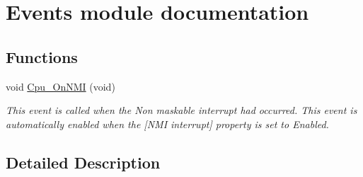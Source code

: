 \hypertarget{group___events__module}{}\section{Events module documentation}
\label{group___events__module}
\subsection*{Functions}
\begin{DoxyCompactItemize}
\item 
void \hyperlink{group___events__module_gabaee6afd9e7b4a0a57dc661945543d24}{Cpu\+\_\+\+On\+N\+MI} (void)\hypertarget{group___events__module_gabaee6afd9e7b4a0a57dc661945543d24}{}\label{group___events__module_gabaee6afd9e7b4a0a57dc661945543d24}

\begin{DoxyCompactList}\small\item\em This event is called when the Non maskable interrupt had occurred. This event is automatically enabled when the \mbox{[}N\+MI interrupt\mbox{]} property is set to \textquotesingle{}Enabled\textquotesingle{}. \end{DoxyCompactList}\end{DoxyCompactItemize}


\subsection{Detailed Description}
